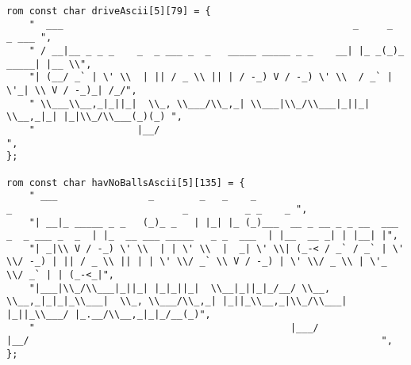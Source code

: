 \begin{lstlisting}
rom const char driveAscii[5][79] = {
	"  ___                                                   _     _         _ ___ ",
	" / __|__ _ _ _    _  _ ___ _  _   _____ _____ _ _    __| |_ _(_)_ _____| |__ \\",
	"| (__/ _` | \' \\  | || / _ \\ || | / -_) V / -_) \' \\  / _` | \'_| \\ V / -_)_| /_/",
	" \\___\\__,_|_||_|  \\_, \\___/\\_,_| \\___|\\_/\\___|_||_| \\__,_|_| |_|\\_/\\___(_)(_) ",
	"                  |__/                                                        ",
};

rom const char havNoBallsAscii[5][135] = {
	" ___                _        _   _    _                                            _                              _          _ _    _ ",
	"| __|_ _____ _ _   (_)_ _   | |_| |_ (_)___  __ _ __ _ _ __  ___   _  _ ___ _  _  | |_  __ ___ _____   _ _  ___  | |__  __ _| | |__| |",
	"| _|\\ V / -_) \' \\  | | \' \\  |  _| \' \\| (_-< / _` / _` | \'  \\/ -_) | || / _ \\ || | | \' \\/ _` \\ V / -_) | \' \\/ _ \\ | \'_ \\/ _` | | (_-<_|",
	"|___|\\_/\\___|_||_| |_|_||_|  \\__|_||_|_/__/ \\__, \\__,_|_|_|_\\___|  \\_, \\___/\\_,_| |_||_\\__,_|\\_/\\___| |_||_\\___/ |_.__/\\__,_|_|_/__(_)",
	"                                             |___/                  |__/                                                              ",
};


\end{lstlisting}
